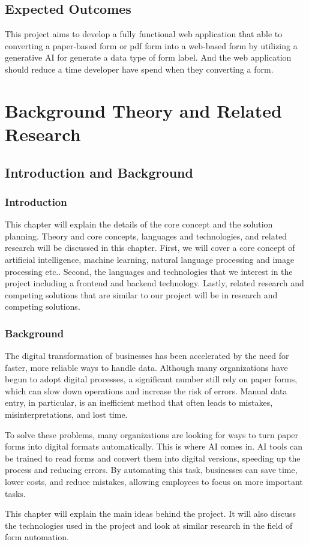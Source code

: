 \documentclass[12pt,oneside,openright,a4paper]{cpe-english-project}
\begin{document}
\section{Expected Outcomes}
This project aims to develop a fully functional web application that able to converting a paper-based form or pdf form into a web-based form by utilizing a generative AI for generate a data type of form label. And the web application should reduce a time developer have spend when they converting a form.

\chapter{Background Theory and Related Research}

\section{Introduction and Background}
\subsection{Introduction}
This chapter will explain the details of the core concept and the solution planning. Theory and core concepts, languages and technologies, and related research will be discussed in this chapter. First, we will cover a core concept of artificial intelligence, machine learning, natural language processing and image processing etc.. Second, the languages and technologies that we interest in the project including a frontend and backend technology. Lastly, related research and competing solutions that are similar to our project will be in research and competing solutions.

\subsection{Background}
The digital transformation of businesses has been accelerated by the need for faster, more reliable ways to handle data. Although many organizations have begun to adopt digital processes, a significant number still rely on paper forms, which can slow down operations and increase the risk of errors. Manual data entry, in particular, is an inefficient method that often leads to mistakes, misinterpretations, and lost time. \par
To solve these problems, many organizations are looking for ways to turn paper forms into digital formats automatically. This is where AI comes in. AI tools can be trained to read forms and convert them into digital versions, speeding up the process and reducing errors. By automating this task, businesses can save time, lower costs, and reduce mistakes, allowing employees to focus on more important tasks.\par
This chapter will explain the main ideas behind the project. It will also discuss the technologies used in the project and look at similar research in the field of form automation.
\end{document}
